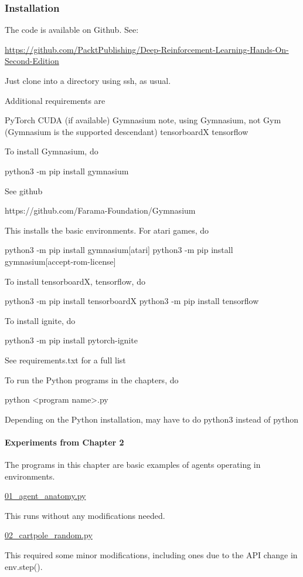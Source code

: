 \documentclass[acmlarge,screen]{acmart}
\begin{document}
\subsubsection{Installation}

The code is available on Github.  See:

\noindent \url{https://github.com/PacktPublishing/Deep-Reinforcement-Learning-Hands-On-Second-Edition}

Just clone into a directory using ssh, as usual.

Additional requirements are

PyTorch
CUDA (if available)
Gymnasium
note, using Gymnasium, not Gym (Gymnasium is the supported descendant)
tensorboardX
tensorflow

To install Gymnasium, do

python3 -m pip install gymnasium

See github

https://github.com/Farama-Foundation/Gymnasium

This installs the basic environments.  For atari games, do

python3 -m pip install gymnasium[atari]
python3 -m pip install gymnasium[accept-rom-license]



To install tensorboardX, tensorflow, do

python3 -m pip install tensorboardX
python3 -m pip install tensorflow

To install ignite, do

python3 -m pip install pytorch-ignite


See requirements.txt for a full list


To run the Python programs in the chapters, do

python <program name>.py

Depending on the Python installation, may have to do python3 instead of python


\paragraph{Experiments from Chapter 2} The programs in this chapter are basic examples of agents operating in environments.

\underline{01\_agent\_anatomy.py}

This runs without any modifications needed.

\underline{02\_cartpole\_random.py}

This required some minor modifications, including ones due to the API change in env.step().
\end{document}

